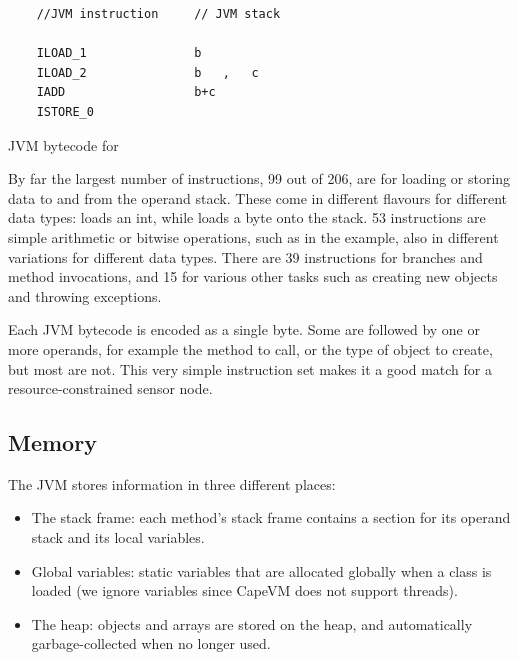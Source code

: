\begin{listing}
    \centering
    \begin{verbatim}
    //JVM instruction     // JVM stack

    ILOAD_1               b
    ILOAD_2               b   ,   c
    IADD                  b+c
    ISTORE_0
    \end{verbatim}
\caption{JVM bytecode for }
\label{lst-basic-jvm-bytecode-example}
\end{listing}

By far the largest number of instructions, 99 out of 206, are for loading or storing data to and from the operand stack. These come in different flavours for different data types:  loads an int, while  loads a byte onto the stack. 53 instructions are simple arithmetic or bitwise operations, such as  in the example, also in different variations for different data types. There are 39 instructions for branches and method invocations, and 15 for various other tasks such as creating new objects and throwing exceptions.

Each JVM bytecode is encoded as a single byte. Some are followed by one or more operands, for example the method to call, or the type of object to create, but most are not. This very simple instruction set makes it a good match for a resource-constrained sensor node.

\subsection{Memory}
\label{sec-background-jvm-memory}
The JVM stores information in three different places:
\begin{itemize}
    \item The stack frame: each method's stack frame contains a section for its operand stack and its local variables.
    \item Global variables: static variables that are allocated globally when a class is loaded (we ignore  variables since CapeVM does not support threads).
    \item The heap: objects and arrays are stored on the heap, and automatically garbage-collected when no longer used.
\end{itemize}

